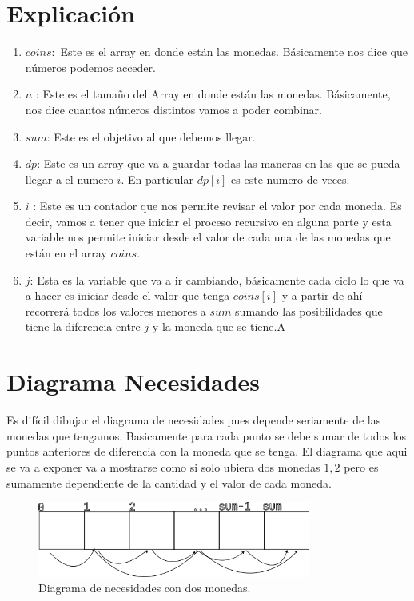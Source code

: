 \documentclass{report}
\begin{document}
\section{Explicación}

\begin{enumerate}
  \item $coins:$ Este es el array en donde están las monedas. Básicamente nos dice que números podemos acceder.
  \item  $n$ : Este es el tamaño del Array en donde están las monedas. Básicamente, nos dice cuantos números distintos vamos a poder combinar.
  \item $sum$: Este es el objetivo al que debemos llegar. 
  \item $dp$: Este es un array que va a guardar todas las maneras en las que se pueda llegar a el numero $i$. En particular $dp[i]$ es este numero de veces.
  \item $i$ : Este es un contador que nos permite revisar el valor por cada moneda. Es decir, vamos a tener que iniciar el proceso recursivo en alguna parte y esta variable nos permite iniciar desde el valor de cada una de las monedas que están en el array $coins$.
  \item $j$: Esta es la variable que va a ir cambiando, básicamente cada ciclo lo que va a hacer es iniciar desde el valor que tenga $coins[i]$ y a partir de ahí recorrerá todos los valores menores a $sum$ sumando las posibilidades que tiene la diferencia entre $j$ y la moneda que se tiene.A
\end{enumerate}

\section{Diagrama Necesidades}

Es difícil dibujar el diagrama de necesidades pues depende seriamente de las monedas que tengamos. Basicamente para cada punto se debe sumar de todos los puntos anteriores de diferencia con la moneda que se tenga. El diagrama que aqui se va a exponer va a mostrarse como si solo ubiera dos monedas $1, 2$ pero es sumamente dependiente de la cantidad y el valor de cada moneda.

\begin{figure}[H]
  \centering
  \includegraphics[width=0.8\textwidth]{img/necesidades_1.png}
  \caption{Diagrama de necesidades con dos monedas.}
  \label{fig:fig1}
\end{figure}
\end{document}
